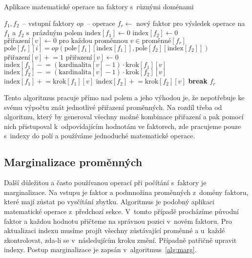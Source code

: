 \begin{algorithm}
\caption{Aplikace matematické operace na faktory s~různými doménami}
\label{alg:apop}
\begin{algorithmic}
\State $f_1, f_2$~-- vstupní faktory
\State $op$~-- operace
\State
\State $f_r \gets$ nový faktor pro výsledek operace na $f_1$ a $f_2$ s~prázdným polem
\State
\State $\text{index}[f_1] \gets 0$
\State $\text{index}[f_2] \gets 0$
\State $\text{přiřazení}[v] \gets 0 \text{ pro každou proměnnou } v \in \text{proměnné}[f_r]$
\State
{}
	\State $\text{pole}[f_r][i] = op(\text{pole}[f_1][\text{index}[f_1]], \text{pole}[f_2][\text{index}[f_2]])$
		\State $\text{přiřazení}[v] \mathrel{+}= 1$
			\State $\text{přiřazení}[v] \gets 0$
			\State $\text{index}[f_1] \mathrel{-}= (\text{kardinalita}[v] - 1) \cdot \text{krok}[f_1][v]$
			\State $\text{index}[f_2] \mathrel{-}= (\text{kardinalita}[v] - 1) \cdot \text{krok}[f_2][v]$
		\Else
			\State $\text{index}[f_1] \mathrel{+}= \text{krok}[f_1][v]$
			\State $\text{index}[f_2] \mathrel{+}= \text{krok}[f_2][v]$
			\State \textbf{break}
		\EndIf
	\EndFor
\EndFor
\State \Return $f_r$
\EndFunction
\end{algorithmic}
\end{algorithm}

Tento algoritmus pracuje přímo nad polem a jeho výhodou je, že nepotřebuje ke svému výpočtu znát jednotlivé přiřazení proměnných.
Na rozdíl třeba od algoritmu, který by generoval všechny možné kombinace přiřazení a pak pomocí nich přistupoval k~odpovídajícím hodnotám ve faktorech, zde pracujeme pouze s~indexy do polí a používáme jednoduché matematické operace.

\subsection{Marginalizace proměnných}

Další důležitou a často používanou operací při počítání s~faktory je marginalizace.
Na vstupu je faktor a podmnožina proměnných z~domény faktoru, které mají zůstat po vysčítání zbytku.
Algoritmus je podobný aplikaci matematické operace z~předchozí sekce.
V~tomto případě procházíme původní faktor a každou hodnotu přičteme na správnou pozici v~novém faktoru.
Pro aktualizaci indexu musíme projít všechny zůstávající proměnné a u~každé zkontrolovat, zda-li se v~následujícím kroku změní.
Případně patřičně upravit indexy.
Postup marginalizace je zapsán v~algoritmus~\ref{alg:marg}.

